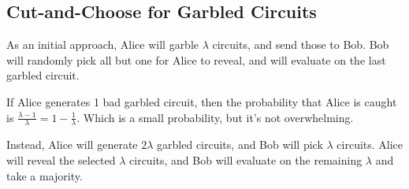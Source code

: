 \subsection{Cut-and-Choose for Garbled Circuits}

As an initial approach, Alice will garble $\lambda$ circuits, and send those to Bob. Bob will randomly pick all but one for Alice to reveal, and will evaluate on the last garbled circuit.



If Alice generates 1 bad garbled circuit, then the probability that Alice is caught is $\frac{\lambda - 1}{\lambda} = 1 - \frac{1}{\lambda}$. Which is a small probability, but it's not overwhelming.

Instead, Alice will generate $2\lambda$ garbled circuits, and Bob will pick $\lambda$ circuits. Alice will reveal the selected $\lambda$ circuits, and Bob will evaluate on the remaining $\lambda$ and take a majority.


